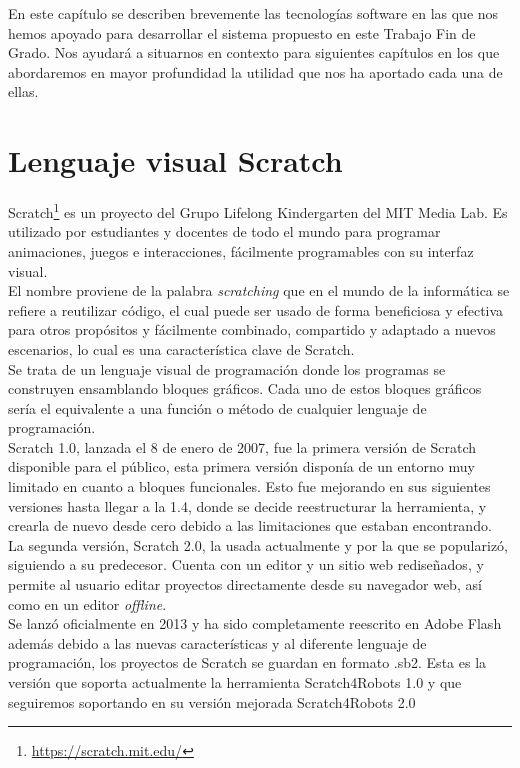 En este capítulo se describen brevemente las tecnologías
software en las que nos hemos apoyado para desarrollar el sistema propuesto
en este Trabajo Fin de Grado. Nos ayudará a situarnos en contexto para siguientes capítulos en los que abordaremos en mayor profundidad la utilidad que nos ha aportado cada una de ellas.

\section{Lenguaje visual Scratch}
\label{sec:scratch}
Scratch\footnote{\url{https://scratch.mit.edu/}} es un proyecto del Grupo Lifelong Kindergarten del MIT Media Lab.
Es utilizado por estudiantes y docentes de todo el mundo para programar animaciones, juegos e interacciones, fácilmente programables con su interfaz visual.\\

El nombre proviene de la palabra \textit{scratching} que en el mundo de la informática se refiere a reutilizar código, el cual puede ser usado de forma beneficiosa y efectiva para otros propósitos y fácilmente combinado, compartido y adaptado a nuevos escenarios, lo cual es una característica clave de Scratch.\\

Se trata de un lenguaje visual de programación donde los programas se construyen ensamblando bloques gráficos. Cada uno de estos bloques gráficos sería el equivalente a una función o método de cualquier lenguaje de programación.\\

Scratch 1.0, lanzada el 8 de enero de 2007, fue la primera versión de Scratch disponible para el público, esta primera versión disponía de un entorno muy limitado en cuanto a bloques funcionales. Esto fue mejorando en sus siguientes versiones hasta llegar a la 1.4, donde se decide reestructurar la herramienta, y crearla de nuevo desde cero debido a las limitaciones que estaban encontrando.\\

La segunda versión, Scratch 2.0, la usada actualmente y por la que se popularizó, siguiendo a su predecesor. Cuenta con un editor y un sitio web rediseñados, y permite al usuario editar proyectos directamente desde su navegador web, así como en un editor \textit{offline}.\\

Se lanzó oficialmente en 2013 y ha sido completamente reescrito en Adobe Flash además debido a las nuevas características y al diferente lenguaje de programación, los proyectos de Scratch se guardan en formato .sb2. Esta es la versión que soporta actualmente la herramienta Scratch4Robots 1.0 y que seguiremos soportando en su versión mejorada Scratch4Robots 2.0\\

